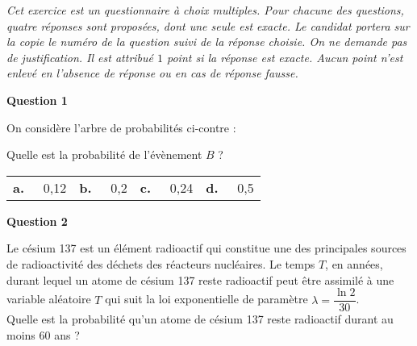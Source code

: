 \documentclass[12pt,french]{article}
\begin{document}
\begin{question}[subtitle={Métropole septembre 2015}]
\emph{Cet exercice est un questionnaire à choix multiples. Pour chacune des questions, quatre réponses sont proposées, dont une seule est exacte. Le candidat portera sur la copie le numéro de la question suivi de la réponse choisie. On ne demande pas de justification. Il est attribué $1$ point si la réponse est exacte. Aucun point n'est enlevé en l'absence de réponse ou en cas de réponse fausse.}

\medskip

\textbf{Question 1}

\parbox{0.6\linewidth}{On considère l'arbre de probabilités ci-contre :}\hfill
\parbox{0.4\linewidth}{%
}
\medskip

Quelle est la probabilité de l'évènement $B$ ?

\medskip
\begin{tabularx}{\linewidth}{*{4}{X}}
\textbf{a.~~} 0,12&\textbf{b.~~} 0,2&\textbf{c.~~} 0,24 &\textbf{d.~~} 0,5
\end{tabularx}
\medskip

\textbf{Question 2}

Le césium 137 est un élément radioactif qui constitue une des principales sources de radioactivité des déchets des réacteurs nucléaires. Le temps $T$, en années, durant lequel un atome de césium 137 reste radioactif peut être assimilé à une variable aléatoire $T$ qui suit la loi exponentielle de paramètre $\lambda = \dfrac{\ln 2}{30}$.\\[5pt]
Quelle est la probabilité qu'un atome de césium 137 reste radioactif durant au moins 60 ans ?


\end{question}
\end{document}

